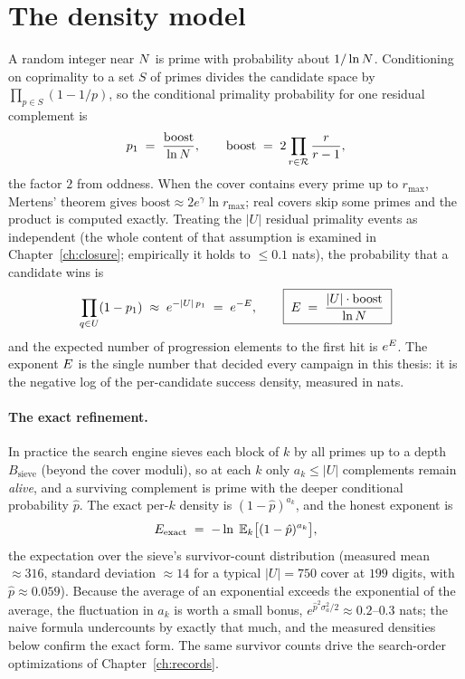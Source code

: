 \section{The density model}\label{sec:density}

A random integer near $N$ is prime with probability about $1/\ln N$.
Conditioning on coprimality to a set $S$ of primes divides the candidate
space by $\prod_{p\in S}(1-1/p)$, so the conditional primality
probability for one residual complement is
\[
p_1\;=\;\frac{\mathrm{boost}}{\ln N},
\qquad
\mathrm{boost}\;=\;2\prod_{r\in\mathcal R}\frac{r}{r-1},
\]
the factor $2$ from oddness. When the cover contains every prime up to
$r_{\max}$, Mertens' theorem gives
$\mathrm{boost}\approx2e^{\gamma}\ln r_{\max}$; real covers skip some
primes and the product is computed exactly. Treating the $|U|$ residual
primality events as independent (the whole content of that assumption is
examined in Chapter~\ref{ch:closure}; empirically it holds to
$\le0.1$ nats), the probability that a candidate wins is
\[
\prod_{q\in U}(1-p_1)\;\approx\;e^{-|U|\,p_1}\;=\;e^{-E},
\qquad
\boxed{\;E\;=\;\frac{|U|\cdot\mathrm{boost}}{\ln N}\;}
\]
and the expected number of progression elements to the first hit is
$e^{E}$. The exponent $E$ is the single number that decided every
campaign in this thesis: it is the negative log of the per-candidate
success density, measured in nats.

\paragraph{The exact refinement.} In practice the search engine sieves
each block of $k$ by all primes up to a depth $B_{\mathrm{sieve}}$
(beyond the cover moduli), so at each $k$ only $a_k\le|U|$ complements
remain \emph{alive}, and a surviving complement is prime with the deeper
conditional probability $\hat p$. The exact per-$k$ density is
$(1-\hat p)^{a_k}$, and the honest exponent is
\[
E_{\mathrm{exact}}\;=\;-\ln\;\mathbb E_k\bigl[(1-\hat p)^{a_k}\bigr],
\]
the expectation over the sieve's survivor-count distribution (measured
mean $\approx316$, standard deviation $\approx14$ for a typical
$|U|=750$ cover at $199$ digits, with $\hat p\approx0.059$). Because the
average of an exponential exceeds the exponential of the average, the
fluctuation in $a_k$ is worth a small bonus, $e^{\hat
p^2\sigma_a^2/2}\approx0.2$--$0.3$ nats; the naive formula undercounts
by exactly that much, and the measured densities below confirm the
exact form. The same survivor counts drive the search-order
optimizations of Chapter~\ref{ch:records}.

